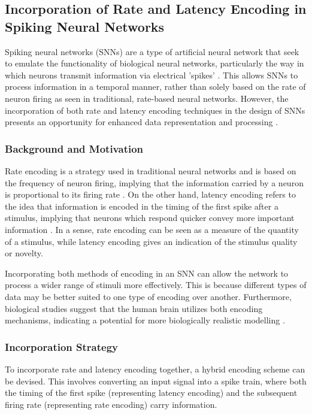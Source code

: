 \subsection{Incorporation of Rate and Latency Encoding in Spiking Neural Networks}

Spiking neural networks (SNNs) are a type of artificial neural network that seek to emulate the functionality of biological neural networks, particularly the way in which neurons transmit information via electrical 'spikes' \cite{maass1997networks}. This allows SNNs to process information in a temporal manner, rather than solely based on the rate of neuron firing as seen in traditional, rate-based neural networks. However, the incorporation of both rate and latency encoding techniques in the design of SNNs presents an opportunity for enhanced data representation and processing \cite{bohte2002spike}.

\subsubsection{Background and Motivation}

Rate encoding is a strategy used in traditional neural networks and is based on the frequency of neuron firing, implying that the information carried by a neuron is proportional to its firing rate \cite{gerstner2002spiking}. On the other hand, latency encoding refers to the idea that information is encoded in the timing of the first spike after a stimulus, implying that neurons which respond quicker convey more important information \cite{thorpe2001spike}. In a sense, rate encoding can be seen as a measure of the quantity of a stimulus, while latency encoding gives an indication of the stimulus quality or novelty.

Incorporating both methods of encoding in an SNN can allow the network to process a wider range of stimuli more effectively. This is because different types of data may be better suited to one type of encoding over another. Furthermore, biological studies suggest that the human brain utilizes both encoding mechanisms, indicating a potential for more biologically realistic modelling \cite{gollisch2008rapid}.

\subsubsection{Incorporation Strategy}

To incorporate rate and latency encoding together, a hybrid encoding scheme can be devised. This involves converting an input signal into a spike train, where both the timing of the first spike (representing latency encoding) and the subsequent firing rate (representing rate encoding) carry information.

